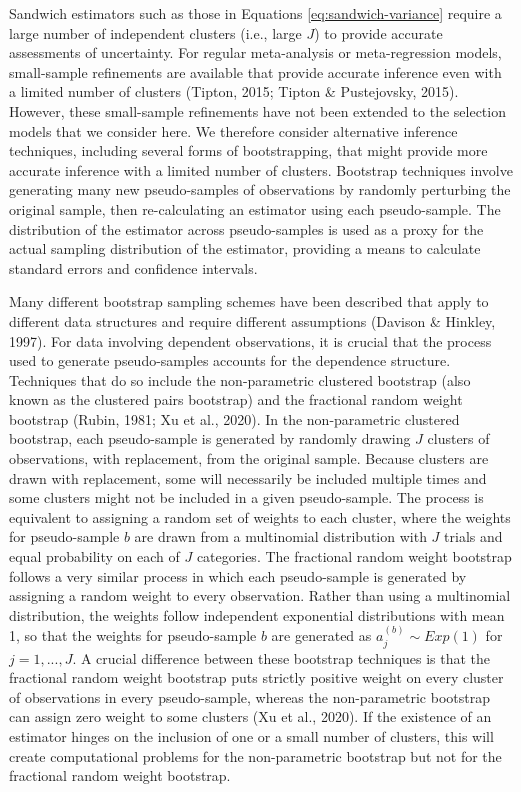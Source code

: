 \documentclass[
  man, donotrepeattitle,floatsintext]{apa7}
\begin{document}
Sandwich estimators such as those in Equations \eqref{eq:sandwich-variance} require a large number of independent clusters (i.e., large \(J\)) to provide accurate assessments of uncertainty.
For regular meta-analysis or meta-regression models, small-sample refinements are available that provide accurate inference even with a limited number of clusters (Tipton, 2015; Tipton \& Pustejovsky, 2015).
However, these small-sample refinements have not been extended to the selection models that we consider here.
We therefore consider alternative inference techniques, including several forms of bootstrapping, that might provide more accurate inference with a limited number of clusters.
Bootstrap techniques involve generating many new pseudo-samples of observations by randomly perturbing the original sample, then re-calculating an estimator using each pseudo-sample.
The distribution of the estimator across pseudo-samples is used as a proxy for the actual sampling distribution of the estimator, providing a means to calculate standard errors and confidence intervals.

Many different bootstrap sampling schemes have been described that apply to different data structures and require different assumptions (Davison \& Hinkley, 1997).
For data involving dependent observations, it is crucial that the process used to generate pseudo-samples accounts for the dependence structure.
Techniques that do so include the non-parametric clustered bootstrap (also known as the clustered pairs bootstrap) and the fractional random weight bootstrap (Rubin, 1981; Xu et al., 2020).
In the non-parametric clustered bootstrap, each pseudo-sample is generated by randomly drawing \(J\) clusters of observations, with replacement, from the original sample.
Because clusters are drawn with replacement, some will necessarily be included multiple times and some clusters might not be included in a given pseudo-sample.
The process is equivalent to assigning a random set of weights to each cluster, where the weights for pseudo-sample \(b\) are drawn from a multinomial distribution with \(J\) trials and equal probability on each of \(J\) categories.
The fractional random weight bootstrap follows a very similar process in which each pseudo-sample is generated by assigning a random weight to every observation.
Rather than using a multinomial distribution, the weights follow independent exponential distributions with mean 1, so that the weights for pseudo-sample \(b\) are generated as \(a^{(b)}_j \sim Exp(1)\) for \(j = 1,...,J\).
A crucial difference between these bootstrap techniques is that the fractional random weight bootstrap puts strictly positive weight on every cluster of observations in every pseudo-sample, whereas the non-parametric bootstrap can assign zero weight to some clusters (Xu et al., 2020).
If the existence of an estimator hinges on the inclusion of one or a small number of clusters, this will create computational problems for the non-parametric bootstrap but not for the fractional random weight bootstrap.
\end{document}
